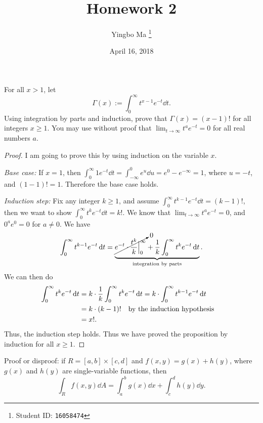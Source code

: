 \documentclass[8pt,twocolumn]{article}
\author{Yingbo Ma \thanks{Student ID: \tt{16058474}}}
\title{\vspace{-1.5cm}Homework 2}
\date{April 16, 2018}
\begin{document}
\maketitle

\begin{Exercise}[number=10]
  For all $x>1$, let
  \[
    \Gamma(x) := \int_0^\infty t^{x-1}e^{-t}\dd{t}.
  \]
  Using integration by parts and induction, prove that $\Gamma(x)=(x-1)!$ for
  all integers $x\ge1$. You may use without proof that
  $\lim_{t\to\infty}t^ae^{-t}=0$ for all real numbers $a$.
\end{Exercise}

\begin{Answer}[number=10]
\begin{proof}
  I am going to prove this by using induction on the variable $x$.

  \emph{Base case:} If $x=1$, then
  $\int_0^\infty1e^{-t}\dd{t}=\int_{-\infty}^0e^u\dd{u} = e^0-e^{-\infty} = 1$,
  where $u=-t$, and $(1-1)!=1$. Therefore the base case holds.

  \emph{Induction step:} Fix any integer $k\ge 1$, and assume $\int_0^\infty
  t^{k-1}e^{-t}\dd{t}=(k-1)!$, then we want to show $\int_0^\infty
  t^{k}e^{-t}\dd{t}=k!$. We know that $\lim_{t\to\infty}t^ae^{-t}=0$, and
  $0^ae^0=0$ for $a\ne0$. We have
  \begin{align*}
    \int_0^\infty t^{k-1}e^{-t}\dd{t} =
    \underbrace{\cancelto{0}{e^{-t}\cdot\frac{t^k}{k}\Big\vert_0^\infty} +
    \frac{1}{k}\int_0^\infty t^ke^{-t} \dd{t}}_\text{integration by parts}.
  \end{align*}
  We can then do
  \begin{align*}
    \int_0^\infty t^{k}e^{-t}\dd{t} &= k\cdot\frac{1}{k}\int_0^\infty t^ke^{-t}
    \dd{t}=k\cdot \int_0^\infty t^{k-1}e^{-t}\dd{t}\\
    &=k\cdot (k-1)!\qq{by the induction hypothesis}\\
    &=x!.
  \end{align*}
  Thus, the induction step holds. Thus we have proved the proposition by
  induction for all $x\ge 1$.
\end{proof}
\end{Answer}

\begin{Exercise}[number=11]
  Proof or disproof: if $R=[a,b]\times[c,d]$ and $f(x,y)=g(x)+h(y)$, where
  $g(x)$ and $h(y)$ are single-variable functions, then
  \[
    \int_R f(x,y)\dd{A} = \int_a^bg(x)\dd{x} + \int_c^d h(y)\dd{y}.
  \]
\end{Exercise}
\end{document}
